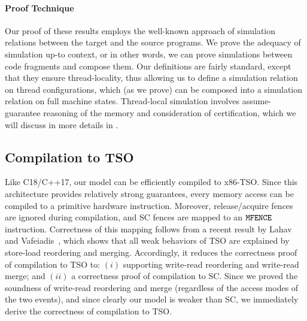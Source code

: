 
\paragraph{Proof Technique}

Our proof of these results employs the well-known approach of simulation relations between the
target and the source programs.  We prove the adequacy of simulation up-to context, or in other
words, we can prove simulations between code fragments and compose them.  Our definitions are fairly
standard, except that they ensure thread-locality, thus allowing us to define a simulation relation
on thread configurations, which (as we prove) can be composed into a simulation relation on full
machine states.  Thread-local simulation involves assume-guarantee reasoning of the memory and
consideration of certification, which we will discuss in more details in
.




\subsection{Compilation to TSO}
\label{sec:compilation_TSO}

Like C18/C++17, our model can be efficiently compiled to x86-TSO.
Since this architecture provides relatively strong guarantees,
every memory access can be compiled to a primitive hardware instruction.
Moreover, release/acquire fences are ignored during compilation,
and SC fences are mapped to an $\texttt{MFENCE}$ instruction.
Correctness of this mapping follows from a recent result by Lahav and Vafeiadis~\cite{fm16},
which shows that all weak behaviors of TSO are explained by store-load reordering and merging.
Accordingly, it reduces the correctness proof of compilation to TSO to:
$(i)$ supporting write-read reordering and write-read merge;
and $(ii)$ a correctness proof of compilation to SC.
Since we proved the soundness of write-read reordering and merge 
(regardless of the access modes of the two events),
and since clearly our model is weaker than SC,
we immediately derive the correctness of compilation to TSO.

